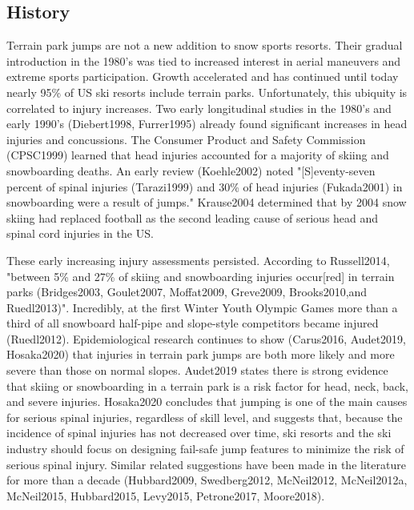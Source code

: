 \documentclass{article}
\begin{document}
\subsection{History}
%
Terrain park jumps are not a new addition to snow sports resorts. Their gradual 
introduction in the 1980's was tied to increased interest in aerial maneuvers 
and extreme sports participation. Growth accelerated and has continued until
today nearly 95\% of US ski resorts include terrain parks. Unfortunately,
this ubiquity is correlated to injury increases.  Two early longitudinal studies  
in the 1980's and early 1990's (Diebert1998, Furrer1995) already found significant 
increases in head injuries and concussions. The Consumer Product and Safety Commission 
(CPSC1999) learned that head injuries accounted for a majority of skiing and 
snowboarding deaths. An early review (Koehle2002) noted "[S]eventy-seven percent 
of spinal injuries (Tarazi1999) and 30\% of head injuries (Fukada2001) in 
snowboarding were a result of jumps." Krause2004 %
determined that by 2004 snow skiing had replaced football as the second leading 
cause of serious head and spinal cord injuries in the US. 

These early increasing injury assessments persisted. According to Russell2014, "between 
5\% and 27\% of skiing and snowboarding injuries occur[red] in terrain parks 
(Bridges2003, Goulet2007,  Moffat2009, Greve2009, Brooks2010,and Ruedl2013)". 
Incredibly, at the first Winter Youth Olympic Games more than a third of all 
snowboard half-pipe and slope-style competitors became injured (Ruedl2012). 
Epidemiological research continues to show (Carus2016, Audet2019, Hosaka2020) 
that injuries in terrain park jumps are both more likely and more severe than 
those on normal slopes.  Audet2019 states  there is strong evidence that skiing 
or snowboarding in a terrain park is a risk factor for head, neck, back, and 
severe injuries. Hosaka2020 concludes that jumping is one of the main causes 
for serious spinal injuries, regardless of skill level, and suggests that, 
because the incidence of spinal injuries has not decreased over time, ski resorts 
and the ski industry should focus on designing fail-safe jump features to minimize 
the risk of serious spinal injury.  Similar related  suggestions have been made 
in the literature for more than a decade (Hubbard2009, Swedberg2012, McNeil2012, 
McNeil2012a, McNeil2015, Hubbard2015, Levy2015, Petrone2017, Moore2018).  
\end{document}
